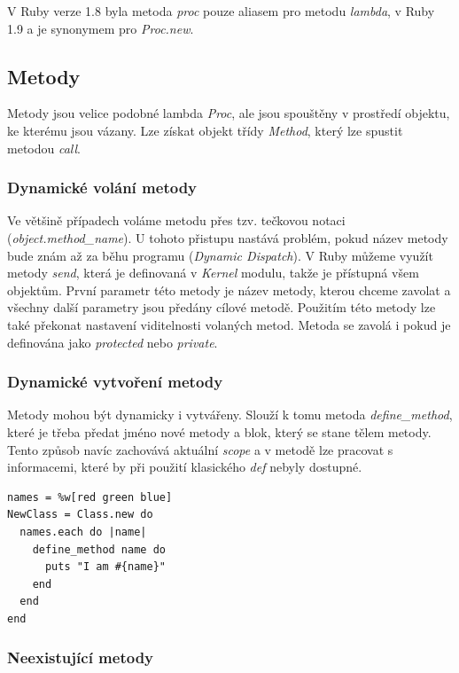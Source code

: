 \documentclass[12pt,a4paper,oneside]{article}
\begin{document}
V Ruby verze 1.8 byla metoda \emph{proc} pouze aliasem pro metodu \emph{lambda}, v Ruby 1.9 a je synonymem pro \emph{Proc.new}.

\subsection{Metody}

Metody jsou velice podobné lambda \emph{Proc}, ale jsou spouštěny v prostředí objektu, ke kterému jsou vázany.  Lze získat objekt třídy \emph{Method}, který lze spustit metodou \emph{call}.

\subsubsection{Dynamické volání metody}

Ve většině případech voláme metodu přes tzv. tečkovou notaci (\emph{object.method\_name}). U tohoto přistupu nastává problém, pokud název metody bude znám až za běhu programu (\emph{Dynamic Dispatch}). V Ruby můžeme využít metody \emph{send}, která je definovaná v \emph{Kernel} modulu, takže je přístupná všem objektům. První parametr této metody je název metody, kterou chceme zavolat a všechny další parametry jsou předány cílové metodě. Použitím této metody lze také překonat nastavení viditelnosti volaných metod. Metoda se zavolá i pokud je definována jako \emph{protected} nebo \emph{private}.

\subsubsection{Dynamické vytvoření metody}

Metody mohou být dynamicky i vytvářeny. Slouží k tomu metoda \emph{define\_method}, které je třeba předat jméno nové metody a blok, který se stane tělem metody. Tento způsob navíc zachovává aktuální \emph{scope} a v metodě lze pracovat s informacemi, které by při použití klasického \emph{def} nebyly dostupné.

\begin{lstlisting}[frame=single]
names = %w[red green blue]
NewClass = Class.new do
  names.each do |name|
    define_method name do
      puts "I am #{name}"
    end
  end
end
\end{lstlisting}
    

\subsubsection{Neexistující metody}
\end{document}
